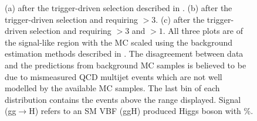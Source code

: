 \begin{figure}
  \caption{(a) \METsig after the trigger-driven selection described in . (b) \jetmetdphi after the trigger-driven selection and requiring \METsig$>3$. (c) \Mjj after the trigger-driven selection and requiring \METsig$>3$ and \jetmetdphi$>1$. All three plots are of the signal-like region with the \ac{MC} scaled using the background estimation methods described in . The disagreement between data and the predictions from background \ac{MC} samples is believed to be due to mismeasured \ac{QCD} multijet events which are not well modelled by the available \ac{MC} samples. The last bin of each distribution contains the events above the range displayed. Signal (gg$\rightarrow$H) refers to an \ac{SM} \ac{VBF} (\ac{ggH}) produced Higgs boson with \%.}
  \label{fig:parkedpresel}
\end{figure}

